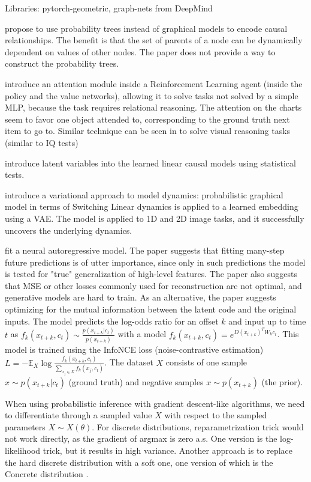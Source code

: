 \documentclass[a4paper,11pt,oneside]{report}
\begin{document}
Libraries: pytorch-geometric, graph-nets from DeepMind

\cite{Genewein} propose to use probability trees instead of graphical models to encode causal relationships. The benefit is that the set of parents of a node can be dynamically dependent on values of other nodes. The paper does not provide a way to construct the probability trees.

\cite{Zambaldi2018} introduce an attention module inside a Reinforcement Learning agent (inside the policy and the value networks), allowing it to solve tasks not solved by a simple MLP, because the task requires relational reasoning. The attention on the charts seem to favor one object attended to, corresponding to the ground truth next item to go to. Similar technique can be seen in \cite{Hahne2019} to solve visual reasoning tasks (similar to IQ tests)

\cite{Xie2020} introduce latent variables into the learned linear causal models using statistical tests.

\cite{Johnson2016} introduce a variational approach to model dynamics: probabilistic graphical model in terms of Switching Linear dynamics is applied to a learned embedding using a VAE. The model is applied to 1D and 2D image tasks, and it successfully uncovers the underlying dynamics.

\cite{VanDenOord2018} fit a neural autoregressive model. The paper suggests that fitting many-step future predictions is of utter importance, since only in such predictions the model is tested for "true" generalization of high-level features. The paper also suggests that MSE or other losses commonly used for reconstruction are not optimal, and generative models are hard to train. As an alternative, the paper suggests optimizing for the mutual information between the latent code and the original inputs. The model predicts the log-odds ratio for an offset $k$ and input up to time $t$ as $f_k(x_{t+k},c_t)\sim \frac{p(x_{t+k}|c_t)}{p(x_{t+k})}$ with a model $f_k(x_{t+k}, c_t)=e^{D(x_{t+k})^TW_kc_t}$. This model is trained using the InfoNCE loss (noise-contrastive estimation) $L=-\mathbb E_X\log\frac{f_k(x_{t+k}, c_t)}{\sum_{x_j\in X}f_k(x_j,c_t)}$. The dataset $X$ consists of one sample $x\sim p(x_{t+k}|c_t)$ (ground truth) and negative samples $x\sim p(x_{t+k})$ (the prior).

When using probabilistic inference with gradient descent-like algorithms, we need to differentiate through a sampled value $X$ with respect to the sampled parameters $X\sim X(\theta)$. For discrete distributions, reparametrization trick would not work directly, as the gradient of argmax is zero a.s. One version is the log-likelihood trick, but it results in high variance. Another approach is to replace the hard discrete distribution with a soft one, one version of which is the Concrete distribution \cite{Maddison2017}.
\end{document}
